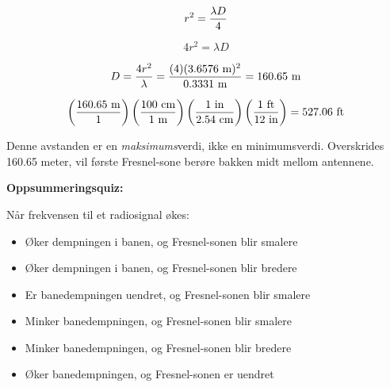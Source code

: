$$r^2 = {\lambda D \over 4}$$

$$4r^2 = \lambda D$$

$$D = {4r^2 \over \lambda} = {(4) (3.6576 \hbox{ m})^2 \over 0.3331 \hbox{ m}} = 160.65 \hbox{ m}$$

$$\left(160.65 \hbox{ m} \over 1 \right) \left(100 \hbox{ cm} \over 1 \hbox{ m} \right) \left(1 \hbox{ in} \over 2.54 \hbox{ cm} \right) \left(1 \hbox{ ft} \over 12 \hbox{ in} \right) = 527.06 \hbox{ ft}$$

Denne avstanden er en {\it maksimums}verdi, ikke en minimumsverdi. Overskrides 160.65 meter, vil første Fresnel-sone berøre bakken midt mellom antennene.












\vfil \eject

\noindent
{\bf Oppsummeringsquiz:}

Når frekvensen til et radiosignal økes:

\begin{itemize}
\item{} Øker dempningen i banen, og Fresnel-sonen blir smalere
\vskip 5pt
\item{} Øker dempningen i banen, og Fresnel-sonen blir bredere
\vskip 5pt
\item{} Er banedempningen uendret, og Fresnel-sonen blir smalere
\vskip 5pt
\item{} Minker banedempningen, og Fresnel-sonen blir smalere
\vskip 5pt
\item{} Minker banedempningen, og Fresnel-sonen blir bredere
\vskip 5pt
\item{} Øker banedempningen, og Fresnel-sonen er uendret
\end{itemize}



